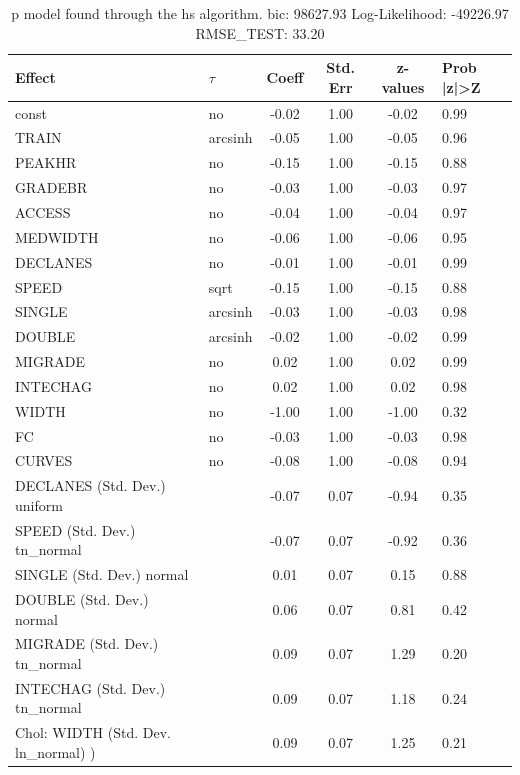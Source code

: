 \begin{table}
	\caption{p model found through the hs algorithm. bic: 98627.93 Log-Likelihood: -49226.97 RMSE_TEST: 33.20}
	\begin{center}
		\begin{tabular}{|l|l|c|c|c|l|}
			\hline
			Effect & $\tau$ & Coeff & Std. Err & z-values & Prob |z|>Z \\
			\hline
			const & no & -0.02 & 1.00 & -0.02 & 0.99 \\
			\hline
			TRAIN & arcsinh & -0.05 & 1.00 & -0.05 & 0.96 \\
			\hline
			PEAKHR & no & -0.15 & 1.00 & -0.15 & 0.88 \\
			\hline
			GRADEBR & no & -0.03 & 1.00 & -0.03 & 0.97 \\
			\hline
			ACCESS & no & -0.04 & 1.00 & -0.04 & 0.97 \\
			\hline
			MEDWIDTH & no & -0.06 & 1.00 & -0.06 & 0.95 \\
			\hline
			DECLANES & no & -0.01 & 1.00 & -0.01 & 0.99 \\
			\hline
			SPEED & sqrt & -0.15 & 1.00 & -0.15 & 0.88 \\
			\hline
			SINGLE & arcsinh & -0.03 & 1.00 & -0.03 & 0.98 \\
			\hline
			DOUBLE & arcsinh & -0.02 & 1.00 & -0.02 & 0.99 \\
			\hline
			MIGRADE & no & 0.02 & 1.00 & 0.02 & 0.99 \\
			\hline
			INTECHAG & no & 0.02 & 1.00 & 0.02 & 0.98 \\
			\hline
			WIDTH & no & -1.00 & 1.00 & -1.00 & 0.32 \\
			\hline
			FC & no & -0.03 & 1.00 & -0.03 & 0.98 \\
			\hline
			CURVES & no & -0.08 & 1.00 & -0.08 & 0.94 \\
			\hline
			DECLANES (Std. Dev.) uniform &  & -0.07 & 0.07 & -0.94 & 0.35 \\
			\hline
			SPEED (Std. Dev.) tn_normal &  & -0.07 & 0.07 & -0.92 & 0.36 \\
			\hline
			SINGLE (Std. Dev.) normal &  & 0.01 & 0.07 & 0.15 & 0.88 \\
			\hline
			DOUBLE (Std. Dev.) normal &  & 0.06 & 0.07 & 0.81 & 0.42 \\
			\hline
			MIGRADE (Std. Dev.) tn_normal &  & 0.09 & 0.07 & 1.29 & 0.20 \\
			\hline
			INTECHAG (Std. Dev.) tn_normal &  & 0.09 & 0.07 & 1.18 & 0.24 \\
			\hline
			 Chol: WIDTH (Std. Dev. ln_normal) ) &  & 0.09 & 0.07 & 1.25 & 0.21 \\

\end{tabular}
\end{center}
\end{table}
